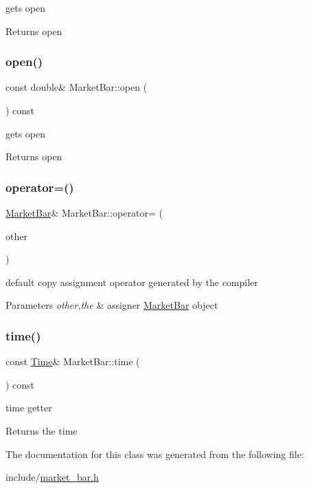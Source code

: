 gets open 

\begin{DoxyReturn}{Returns}
open 
\end{DoxyReturn}
\mbox{\label{classMarketBar_a2d0ebff20fd2d65f1b85da9ce7f5a836}} 
\subsubsection{\texorpdfstring{open()}{open()}}
{\footnotesize\ttfamily const double\& Market\+Bar\+::open (\begin{DoxyParamCaption}{ }\end{DoxyParamCaption}) const}



gets open 

\begin{DoxyReturn}{Returns}
open 
\end{DoxyReturn}
\mbox{\label{classMarketBar_aa0a4209809deddf5fb61272d405b1ddc}} 
\subsubsection{\texorpdfstring{operator=()}{operator=()}}
{\footnotesize\ttfamily \hyperlink{classMarketBar}{Market\+Bar}\& Market\+Bar\+::operator= (\begin{DoxyParamCaption}\item[{const \hyperlink{classMarketBar}{Market\+Bar} \&}]{other }\end{DoxyParamCaption})\hspace{0.3cm}{\ttfamily [default]}}



default copy assignment operator generated by the compiler 


\begin{DoxyParams}{Parameters}
{\em other,the} & assigner \hyperlink{classMarketBar}{Market\+Bar} object \\
\hline
\end{DoxyParams}
\mbox{\label{classMarketBar_aa49e0b737dca9bd90d119ed354f091e4}} 
\subsubsection{\texorpdfstring{time()}{time()}}
{\footnotesize\ttfamily const \hyperlink{classMarketBar_a0d7dabe1fd00e674ef72f54bb1ff9ad0}{Time}\& Market\+Bar\+::time (\begin{DoxyParamCaption}{ }\end{DoxyParamCaption}) const}



time getter 

\begin{DoxyReturn}{Returns}
the time 
\end{DoxyReturn}


The documentation for this class was generated from the following file\+:\begin{DoxyCompactItemize}
\item 
include/\hyperlink{market__bar_8h}{market\+\_\+bar.\+h}\end{DoxyCompactItemize}
